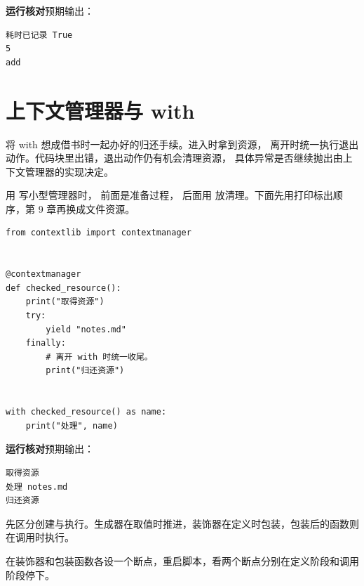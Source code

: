 \textbf{运行核对}\enspace 预期输出：
\begin{lstlisting}[language={},numbers=none]
耗时已记录 True
5
add
\end{lstlisting}

\par


\section{上下文管理器与 with}

将 with 想成借书时一起办好的归还手续。进入时拿到资源，
离开时统一执行退出动作。代码块里出错，退出动作仍有机会清理资源，
具体异常是否继续抛出由上下文管理器的实现决定。

用  写小型管理器时， 前面是准备过程，
后面用  放清理。下面先用打印标出顺序，第 9 章再换成文件资源。


\begin{lstlisting}[title={\code{managed_demo.py}}]
from contextlib import contextmanager


@contextmanager
def checked_resource():
    print("取得资源")
    try:
        yield "notes.md"
    finally:
        # 离开 with 时统一收尾。
        print("归还资源")


with checked_resource() as name:
    print("处理", name)
\end{lstlisting}


\textbf{运行核对}\enspace 预期输出：
\begin{lstlisting}[language={},numbers=none]
取得资源
处理 notes.md
归还资源
\end{lstlisting}

\par

\begin{myunderstanding}
先区分创建与执行。生成器在取值时推进，装饰器在定义时包装，包装后的函数则在调用时执行。
\end{myunderstanding}

\begin{pycharmpractice}
在装饰器和包装函数各设一个断点，重启脚本，看两个断点分别在定义阶段和调用阶段停下。
\end{pycharmpractice}

